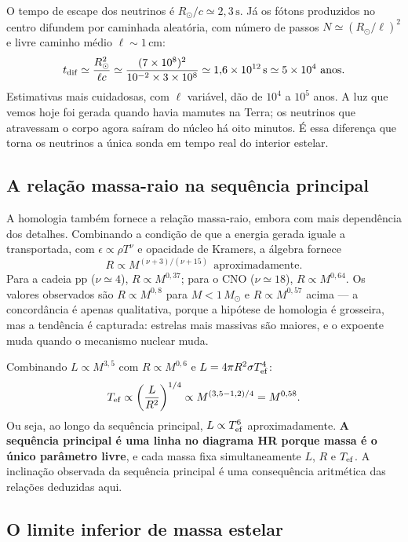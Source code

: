 \documentclass[11pt,a4paper]{article}
\begin{document}
O tempo de escape dos neutrinos é $R_\odot/c\simeq2{,}3\,\mathrm{s}$. Já os fótons produzidos no centro difundem por caminhada aleatória, com número de passos $N\simeq(R_\odot/\ell)^{2}$ e livre caminho médio $\ell\sim1\,\mathrm{cm}$:
\[
t_{\rm dif}\simeq\frac{R_\odot^{2}}{\ell c}\simeq\frac{(7\times10^{8})^{2}}{10^{-2}\times3\times10^{8}}\simeq1{,}6\times10^{12}\,\mathrm{s}\simeq5\times10^{4}\ \text{anos}.
\]
Estimativas mais cuidadosas, com $\ell$ variável, dão de $10^{4}$ a $10^{5}$ anos. A luz que vemos hoje foi gerada quando havia mamutes na Terra; os neutrinos que atravessam o corpo agora saíram do núcleo há oito minutos. É essa diferença que torna os neutrinos a única sonda em tempo real do interior estelar.

\subsection*{A relação massa-raio na sequência principal}

A homologia também fornece a relação massa-raio, embora com mais dependência dos detalhes. Combinando a condição de que a energia gerada iguale a transportada, com $\epsilon\propto\rho T^{\nu}$ e opacidade de Kramers, a álgebra fornece
\[
R\propto M^{(\nu+3)/(\nu+15)}\ \ \text{aproximadamente}.
\]
Para a cadeia pp ($\nu\simeq4$), $R\propto M^{0{,}37}$; para o CNO ($\nu\simeq18$), $R\propto M^{0{,}64}$. Os valores observados são $R\propto M^{0{,}8}$ para $M<1\,M_\odot$ e $R\propto M^{0{,}57}$ acima --- a concordância é apenas qualitativa, porque a hipótese de homologia é grosseira, mas a tendência é capturada: estrelas mais massivas são maiores, e o expoente muda quando o mecanismo nuclear muda.

Combinando $L\propto M^{3{,}5}$ com $R\propto M^{0{,}6}$ e $L=4\pi R^{2}\sigma T_{\rm ef}^{4}$:
\[
T_{\rm ef}\propto\left(\frac{L}{R^{2}}\right)^{1/4}\propto M^{(3{,}5-1{,}2)/4}=M^{0{,}58}.
\]
Ou seja, ao longo da sequência principal, $L\propto T_{\rm ef}^{6}$ aproximadamente. \textbf{A sequência principal é uma linha no diagrama HR porque massa é o único parâmetro livre}, e cada massa fixa simultaneamente $L$, $R$ e $T_{\rm ef}$. A inclinação observada da sequência principal é uma consequência aritmética das relações deduzidas aqui.

\subsection*{O limite inferior de massa estelar}
\end{document}
